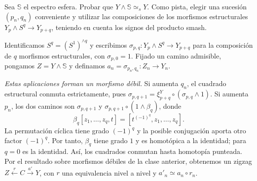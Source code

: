 \begin{ejer}\label{ejer:c10-unidad-smash}
Sea $\mathbb S$ el espectro esfera. Probar que $Y\wedge\mathbb S\simeq_s Y$. Como pista, elegir una sucesión $(p_n,q_n)$ conveniente y utilizar las composiciones de los morfismos estructurales $Y_p\wedge S^q\to Y_{p+q}$, teniendo en cuenta los signos del producto smash.
\end{ejer}
\begin{sol}
Identificamos $S^q=(S^1)^{\wedge q}$ y escribimos $\sigma_{p,q}\colon Y_p\wedge S^q\to Y_{p+q}$ para la composición de $q$ morfismos estructurales, con $\sigma_{p,0}=1$. Fijado un camino admisible, pongamos $Z=Y\wedge\mathbb S$ y definamos $a_n=\sigma_{p_n,q_n}\colon Z_n\to Y_n$.

\emph{Estas aplicaciones forman un morfismo débil.} Si aumenta $q_n$, el cuadrado estructural conmuta estrictamente, pues $\sigma_{p,q+1}=\xi_{p+q}^Y\circ(\sigma_{p,q}\wedge1)$. Si aumenta $p_n$, los dos caminos son $\sigma_{p,q+1}$ y $\sigma_{p,q+1}\circ(1\wedge\beta_q)$, donde
\[
\beta_q[z_1,\ldots,z_q,t]
=[t^{(-1)^q},z_1,\ldots,z_q].
\]
La permutación cíclica tiene grado $(-1)^q$ y la posible conjugación aporta otro factor $(-1)^q$. Por tanto, $\beta_q$ tiene grado $1$ y es homotópica a la identidad; para $q=0$ es la identidad. Así, los cuadrados conmutan hasta homotopía punteada. Por el resultado sobre morfismos débiles de la clase anterior, obtenemos un zigzag $Z\xleftarrow{r}C\xrightarrow{a'}Y$, con $r$ una equivalencia nivel a nivel y $a'_n\simeq a_n\circ r_n$.


\end{sol}
